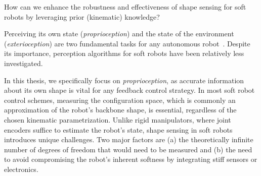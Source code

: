 \begin{researchquestion}\label{rq:shape_sensing}
    How can we enhance the robustness and effectiveness of shape sensing for soft robots by leveraging prior (kinematic) knowledge?
\end{researchquestion}
Perceiving its own state (\emph{proprioception}) and the state of the environment (\emph{exterioception}) are two fundamental tasks for any autonomous robot~\citep{thuruthel2019soft}.
Despite its importance, perception algorithms for soft robots have been relatively less investigated.

In this thesis, we specifically focus on \emph{proprioception}, as accurate information about its own shape is vital for any feedback control strategy. 
In most soft robot control schemes, measuring the configuration space, which is commonly an approximation of the robot’s backbone shape, is essential, regardless of the chosen kinematic parametrization. Unlike rigid manipulators, where joint encoders suffice to estimate the robot’s state, shape sensing in soft robots introduces unique challenges. Two major factors are (a) the theoretically infinite number of degrees of freedom that would need to be measured and (b) the need to avoid compromising the robot’s inherent softness by integrating stiff sensors or electronics.
